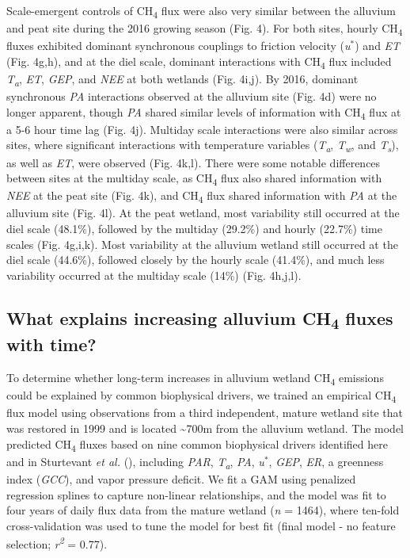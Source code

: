 \documentclass[
  12pt,
]{article}
\begin{document}
Scale-emergent controls of CH\textsubscript{4} flux were also very
similar between the alluvium and peat site during the 2016 growing
season (Fig. 4). For both sites, hourly CH\textsubscript{4} fluxes
exhibited dominant synchronous couplings to friction velocity
(\emph{u\(^\ast\)}) and \emph{ET} (Fig. 4g,h), and at the diel scale,
dominant interactions with CH\textsubscript{4} flux included
\emph{T\textsubscript{a}}, \emph{ET}, \emph{GEP}, and \emph{NEE} at both
wetlands (Fig. 4i,j). By 2016, dominant synchronous \emph{PA}
interactions observed at the alluvium site (Fig. 4d) were no longer
apparent, though \emph{PA} shared similar levels of information with
CH\textsubscript{4} flux at a 5-6 hour time lag (Fig. 4j). Multiday
scale interactions were also similar across sites, where significant
interactions with temperature variables (\emph{T\textsubscript{a}},
\emph{T\textsubscript{w}}, and \emph{T\textsubscript{s}}), as well as
\emph{ET}, were observed (Fig. 4k,l). There were some notable
differences between sites at the multiday scale, as CH\textsubscript{4}
flux also shared information with \emph{NEE} at the peat site (Fig. 4k),
and CH\textsubscript{4} flux shared information with \emph{PA} at the
alluvium site (Fig. 4l). At the peat wetland, most variability still
occurred at the diel scale (48.1\%), followed by the multiday (29.2\%)
and hourly (22.7\%) time scales (Fig. 4g,i,k). Most variability at the
alluvium wetland still occurred at the diel scale (44.6\%), followed
closely by the hourly scale (41.4\%), and much less variability occurred
at the multiday scale (14\%) (Fig. 4h,j,l).

\subsection{\texorpdfstring{What explains increasing alluvium
CH\textsubscript{4} fluxes with
time?}{What explains increasing alluvium CH4 fluxes with time?}}\label{what-explains-increasing-alluvium-ch4-fluxes-with-time}

To determine whether long-term increases in alluvium wetland
CH\textsubscript{4} emissions could be explained by common biophysical
drivers, we trained an empirical CH\textsubscript{4} flux model using
observations from a third independent, mature wetland site that was
restored in 1999 and is located \textasciitilde700m from the alluvium
wetland. The model predicted CH\textsubscript{4} fluxes based on nine
common biophysical drivers identified here and in Sturtevant \emph{et
al.} (), including
\emph{PAR}, \emph{T\textsubscript{a}}, \emph{PA}, \emph{u\(^\ast\)},
\emph{GEP}, \emph{ER}, a greenness index (\emph{GCC}), and vapor
pressure deficit. We fit a GAM using penalized regression splines to
capture non-linear relationships, and the model was fit to four years of
daily flux data from the mature wetland (\emph{n} = 1464), where
ten-fold cross-validation was used to tune the model for best fit (final
model - no feature selection; \emph{r\textsuperscript{2}} = 0.77).
\end{document}
